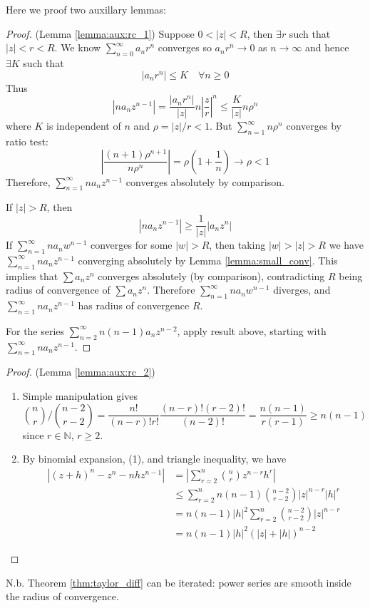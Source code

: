 \documentclass[10pt, a4paper, twoside]{report}
\begin{document}
Here we proof two auxillary lemmas:
\begin{proof}
    (Lemma \ref{lemma:aux:rc_1}) Suppose \(0<|z|<R\), then \(\exists r\) such that \(|z|<r<R\). We know \(\sum_{n=0}^{\infty}a_nr^n\) converges so \(a_nr^n\to 0\) as \(n\to\infty\) and hence \(\exists K\) such that 
    \[|a_nr^n|\leq K\quad\forall n\geq 0\]
    Thus 
    \[|na_nz^{n-1}|=\frac{|a_nr^n|}{|z|}n\left|\frac zr\right|^n\leq\frac K{|z|}n\rho^n\]
    where \(K\) is independent of \(n\) and \(\rho=|z|/r<1\). But \(\sum_{n=1}^{\infty}n\rho^n\) converges by ratio test:
    \[\left|\frac{(n+1)\rho^{n+1}}{n\rho^n}\right|=\rho\left(1+\frac 1n\right)\to\rho<1\]
    Therefore, \(\sum_{n=1}^\infty na_nz^{n-1}\) converges absolutely by comparison.

    If \(|z|>R\), then 
    \[|na_nz^{n-1}|\geq\frac 1{|z|}|a_nz^n|\]
    If \(\sum_{n=1}^{\infty}na_nw^{n-1}\) converges for some \(|w|>R\), then taking \(|w|>|z|>R\) we have \(\sum_{n=1}^{\infty}na_nz^{n-1}\) converging absolutely by Lemma \ref{lemma:small_conv}. This implies that \(\sum a_nz^n\) converges absolutely (by comparison), contradicting \(R\) being radius of convergence of \(\sum a_nz^n\). Therefore \(\sum_{n=1}^{\infty}na_nw^{n-1}\) diverges, and \(\sum_{n=1}^{\infty}na_nz^{n-1}\) has radius of convergence \(R\).

    For the series \(\sum_{n=2}^{\infty}n(n-1)a_nz^{n-2}\), apply result above, starting with \(\sum_{n=1}^{\infty}na_nz^{n-1}\).
\end{proof}
\begin{proof}
    (Lemma \ref{lemma:aux:rc_2})
    \begin{enumerate}
        \item Simple manipulation gives
        \[{\binom nr}/{\binom{n-2}{r-2}}=\frac{n!}{(n-r)!r!}\frac{(n-r)!(r-2)!}{(n-2)!}=\frac{n(n-1)}{r(r-1)}\geq n(n-1)\]
        since \(r\in\mathbb{N}\), \(r\geq 2\).
        \item By binomial expansion, (1), and triangle inequality, we have 
        \begin{align*}
            |(z+h)^n-z^n-nhz^{n-1}|&=\left|\sum_{r=2}^{n}\binom nrz^{n-r}h^r\right| \\
            &\leq\sum_{r=2}^{n}n(n-1)\binom{n-2}{r-2}|z|^{n-r}|h|^r \\
            &=n(n-1)|h|^2\sum_{r=2}^{n}\binom{n-2}{r-2}|z|^{n-r} \\
            &=n(n-1)|h|^2(|z|+|h|)^{n-2}
        \end{align*}
    \end{enumerate}
\end{proof}
N.b. Theorem \ref{thm:taylor_diff} can be iterated: power series are smooth inside the radius of convergence. 
\end{document}
